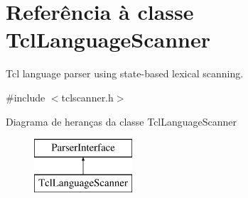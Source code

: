 \hypertarget{class_tcl_language_scanner}{\section{Referência à classe Tcl\-Language\-Scanner}
\label{class_tcl_language_scanner}
}


Tcl language parser using state-\/based lexical scanning.  




{\ttfamily \#include $<$tclscanner.\-h$>$}

Diagrama de heranças da classe Tcl\-Language\-Scanner\begin{figure}[H]
\begin{center}
\leavevmode
\includegraphics[height=2.000000cm]{class_tcl_language_scanner}
\end{center}
\end{figure}
